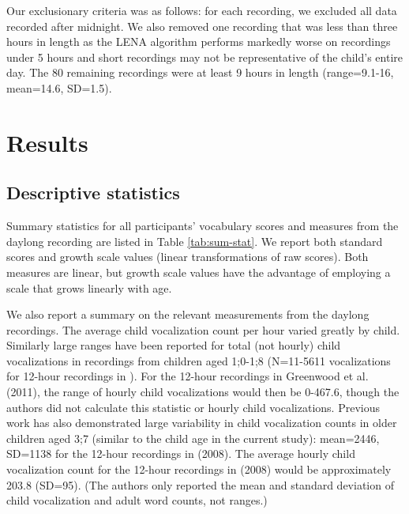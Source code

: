 \documentclass[a4paper,man,natbib,donotrepeattitle, apacite]{apa6}
\begin{document}
Our exclusionary criteria was as follows: for each recording, we excluded all data recorded after midnight. We also removed one recording that was less than three hours in length as the LENA algorithm performs markedly worse on recordings under 5 hours \cite{xuReliabilityLENALanguage2009} and short recordings may not be representative of the child’s entire day. The 80 remaining recordings were at least 9 hours in length (range=9.1-16, mean=14.6, SD=1.5).

\section{Results}

\subsection{Descriptive statistics}

Summary statistics for all participants’ vocabulary scores and measures from the daylong recording are listed in Table \ref{tab:sum-stat}. We report both standard scores and growth scale values (linear transformations of raw scores). Both measures are linear, but growth scale values have the advantage of employing a scale that grows linearly with age. 

We also report a summary on the relevant measurements from the daylong recordings. The average child vocalization count per hour varied greatly by child. Similarly large ranges have been reported for total (not hourly) child vocalizations in recordings from children aged 1;0-1;8 (N=11-5611 vocalizations for 12-hour recordings in ). For the 12-hour recordings in Greenwood et al. (2011), the range of hourly child vocalizations would then be 0-467.6, though the authors did not calculate this statistic or hourly child vocalizations. Previous work has also demonstrated large variability in child vocalization counts in older children aged 3;7 (similar to the child age in the current study): mean=2446, SD=1138 for the 12-hour recordings in \citeauthor{gilkersonLENANaturalLanguage2008} (2008). The average hourly child vocalization count for the 12-hour recordings in \citeauthor{gilkersonLENANaturalLanguage2008} (2008) would be approximately 203.8 (SD=95). (The authors only reported the mean and standard deviation of child vocalization and adult word counts, not ranges.) 
\end{document}
